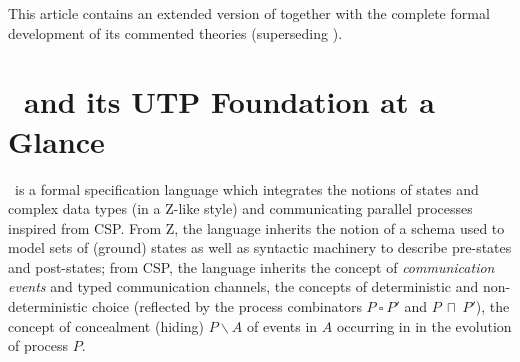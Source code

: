 \documentclass[11pt,a4paper]{article}
\begin{document}
This article contains an extended version of \cite{DBLP:conf/vstte/FeliachiGW12} together with the complete 
formal development of its commented theories (superseding \cite{fgw11rapport-lri}). 

\section{\Circus\ and its UTP Foundation at a Glance}\label{foundation}
\Circus\ is a formal specification language \cite{WC02} which
integrates the notions of states and complex data types (in a Z-like
style) and communicating parallel processes inspired from CSP.
From Z, the language inherits the notion of a schema used to
model sets of (ground) states as well as syntactic machinery to describe
pre-states and post-states; from CSP, the language inherits 
the concept of \emph{communication events} and typed communication channels, 
the concepts of deterministic and non-deterministic choice
(reflected by the process combinators $P~\square~P'$ and $P~\sqcap~P'$),
the concept of concealment (hiding) $P \backslash A$ of events in $A$ occurring in 
in the evolution of process $P$.
 \vspace{-0.3cm}
\label{CircusUTP}
\end{document}
